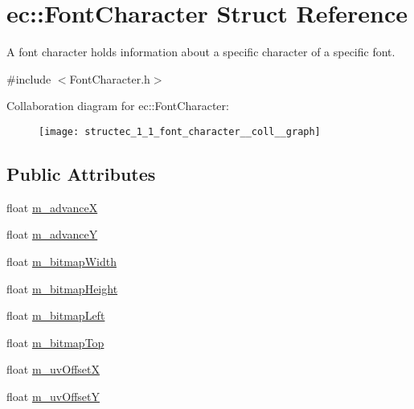 \hypertarget{structec_1_1_font_character}{}\section{ec\+:\+:Font\+Character Struct Reference}
\label{structec_1_1_font_character}


A font character holds information about a specific character of a specific font.  




{\ttfamily \#include $<$Font\+Character.\+h$>$}



Collaboration diagram for ec\+:\+:Font\+Character\+:\nopagebreak
\begin{figure}[H]
\begin{center}
\leavevmode
\texttt{[image: structec\_1\_1\_font\_character\_\_coll\_\_graph]}
\end{center}
\end{figure}
\subsection*{Public Attributes}
\begin{DoxyCompactItemize}
\item 
float \mbox{\hyperlink{structec_1_1_font_character_a3dfcbeba30562b00daf057ac7d23c762}{m\+\_\+advanceX}}
\item 
float \mbox{\hyperlink{structec_1_1_font_character_afea51e45e05b1ac9bcf351184dde2286}{m\+\_\+advanceY}}
\item 
float \mbox{\hyperlink{structec_1_1_font_character_a29e1802582b887199a7c3484f7e99b09}{m\+\_\+bitmap\+Width}}
\item 
float \mbox{\hyperlink{structec_1_1_font_character_a4ab090e6a8358c152e94a931fe651423}{m\+\_\+bitmap\+Height}}
\item 
float \mbox{\hyperlink{structec_1_1_font_character_a5f666f5036f0ddf417c1b1e3475e433c}{m\+\_\+bitmap\+Left}}
\item 
float \mbox{\hyperlink{structec_1_1_font_character_a1555f3f60ade4c5a6a22f73d68710958}{m\+\_\+bitmap\+Top}}
\item 
float \mbox{\hyperlink{structec_1_1_font_character_a13e3f7cbc190b61581c6909bff262133}{m\+\_\+uv\+OffsetX}}
\item 
float \mbox{\hyperlink{structec_1_1_font_character_ac48d060931b82412610d9749b1374db3}{m\+\_\+uv\+OffsetY}}
\end{DoxyCompactItemize}



